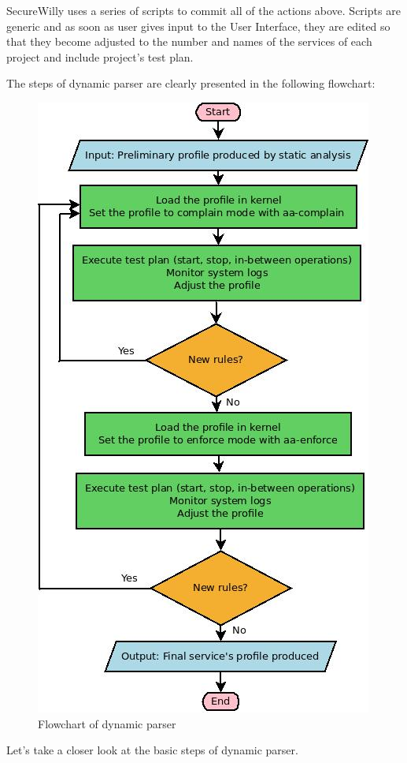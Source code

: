 SecureWilly uses a series of scripts to commit all of the actions above. Scripts are generic and as soon as user gives input to the User Interface, they are edited so that they become adjusted to the number and names of the services of each project and include project's test plan.

The steps of dynamic parser are clearly presented in the following flowchart:

\hfill\break\hfill\break\hfill\break\hfill\break\hfill\break

\begin{figure}[hp!]
  \centering
   \includegraphics[width=0.8\linewidth]{../figures/DynamicAlgo.jpeg}
   \caption{Flowchart of dynamic parser}
\end{figure}

Let's take a closer look at the basic steps of dynamic parser.

